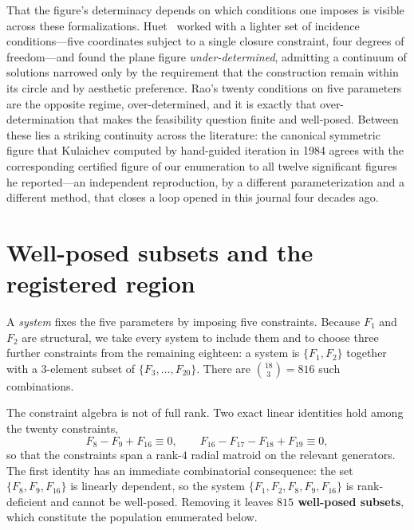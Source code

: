 \documentclass[pdflatex,sn-mathphys-num]{sn-jnl}
\begin{document}
That the figure's determinacy depends on which conditions one imposes is visible across these formalizations. Huet~\cite{Huet2002} worked with a lighter set of incidence conditions---five coordinates subject to a single closure constraint, four degrees of freedom---and found the plane figure \emph{under-determined}, admitting a continuum of solutions narrowed only by the requirement that the construction remain within its circle and by aesthetic preference. Rao's twenty conditions on five parameters are the opposite regime, over-determined, and it is exactly that over-determination that makes the feasibility question finite and well-posed. Between these lies a striking continuity across the literature: the canonical symmetric figure that Kulaichev computed by hand-guided iteration in 1984 agrees with the corresponding certified figure of our enumeration to all twelve significant figures he reported---an independent reproduction, by a different parameterization and a different method, that closes a loop opened in this journal four decades ago.

\section{Well-posed subsets and the registered region}\label{sec2}

A \emph{system} fixes the five parameters by imposing five constraints. Because $F_1$ and $F_2$ are structural, we take every system to include them and to choose three further constraints from the remaining eighteen: a system is $\{F_1,F_2\}$ together with a $3$-element subset of $\{F_3,\dots,F_{20}\}$. There are $\binom{18}{3}=816$ such combinations.

The constraint algebra is not of full rank. Two exact linear identities hold among the twenty constraints,
\begin{equation}
F_8 - F_9 + F_{16} \equiv 0,
\qquad
F_{16} - F_{17} - F_{18} + F_{19} \equiv 0,
\label{eq:identities}
\end{equation}
so that the constraints span a rank-$4$ radial matroid on the relevant generators.
The first identity has an immediate combinatorial consequence: the set $\{F_8,F_9,F_{16}\}$ is linearly dependent, so the system $\{F_1,F_2,F_8,F_9,F_{16}\}$ is rank-deficient and cannot be well-posed. Removing it leaves \textbf{$815$ well-posed subsets}, which constitute the population enumerated below.
\end{document}
